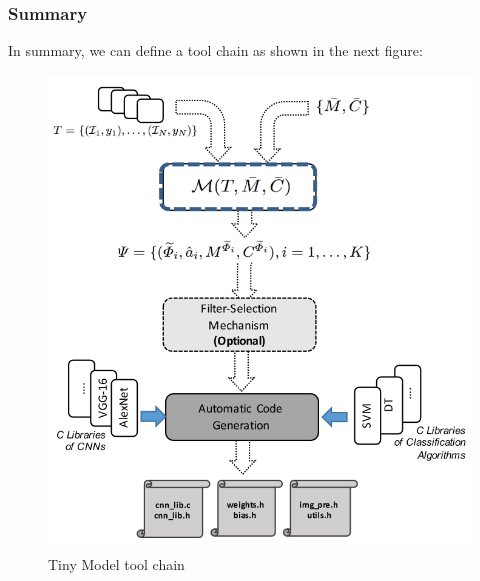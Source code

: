 \documentclass{article}
\begin{document}
      \subsubsection{Summary}
      In summary, we can define a tool chain as shown in the next figure:
      \begin{figure}[H]
        \includegraphics[scale=0.25]{../Images/OptToolchain.png}
        \centering
        \caption{Tiny Model tool chain}
      \end{figure}
\end{document}
